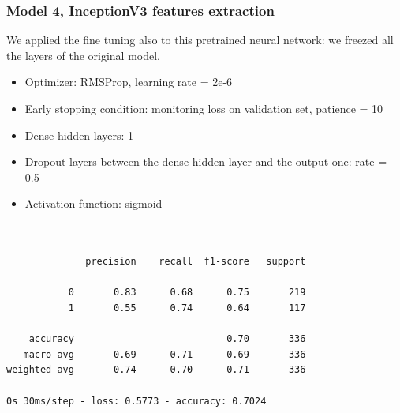 \documentclass{article}
\begin{document}
\subsubsection{Model 4, InceptionV3 features extraction}
We applied the fine tuning also to this pretrained neural network: we freezed all the layers of the original model.

\begin{itemize}
\item Optimizer: RMSProp, learning rate = 2e-6
\item Early stopping condition: monitoring loss on validation set, patience = 10
\item Dense hidden layers: 1
\item Dropout layers between the dense hidden layer and the output one: rate = 0.5
\item Activation function: sigmoid
\end{itemize}

\begin{verbatim}


              precision    recall  f1-score   support

           0       0.83      0.68      0.75       219
           1       0.55      0.74      0.64       117

    accuracy                           0.70       336
   macro avg       0.69      0.71      0.69       336
weighted avg       0.74      0.70      0.71       336

0s 30ms/step - loss: 0.5773 - accuracy: 0.7024

\end{verbatim}
\end{document}
